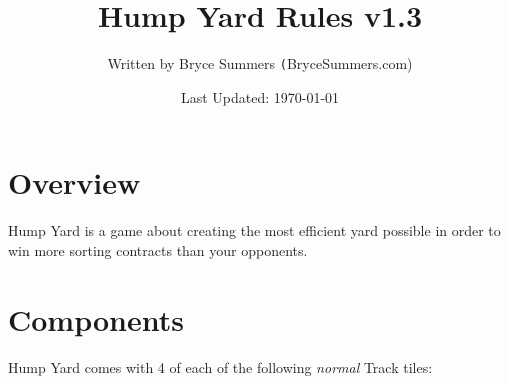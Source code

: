 \documentclass[12pt, letterpaper]{article}
\begin{document}
\title{\color{blue}Hump Yard Rules v1.3}
\author{Written by Bryce Summers \texttt(BryceSummers.com)}
\date{\color{red}Last Updated: \today}
\maketitle

\tableofcontents 

\section{Overview}

Hump Yard is a game about creating the most efficient yard possible in order to win more sorting contracts than your opponents.

\newpage
\section{Components}

Hump Yard comes with 4 of each of the following \textit{normal} Track tiles:
\end{document}
